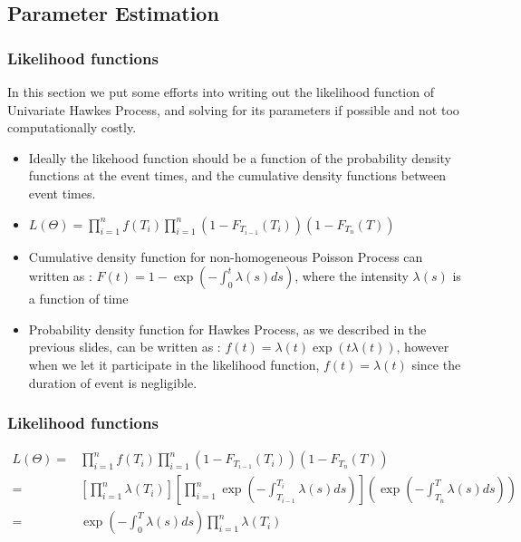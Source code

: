 \documentclass{beamer}
\begin{document}
\subsection{Parameter Estimation}
\begin{frame}
\frametitle{Likelihood functions}
In this section we put some efforts into writing out the likelihood function of Univariate Hawkes Process, and solving for its parameters if possible and not too computationally costly.
\begin{itemize}
	\item Ideally the likehood function should be a function of the probability density functions at the event times, and the cumulative density functions between event times.
	\item $L(\Theta) = \prod_{i=1}^n f(T_{i}) \prod_{i=1}^n (1-F_{T_{i-1}}(T_i)) (1-F_{T_{n}}(T))$
	\item Cumulative density function for non-homogeneous Poisson Process can written as : $F(t) = 1 - \exp(-\int_0^t \lambda(s) ds)$, where the intensity $\lambda(s)$ is a function of time
	\item Probability density function for Hawkes Process, as we described in the previous slides, can be written as : $f(t) = \lambda(t) \exp(t\lambda(t))$, however when we let it participate in the likelihood function, $f(t) = \lambda(t)$ since the duration of event is negligible.
\end{itemize}
\end{frame}

\begin{frame}
\frametitle{Likelihood functions}
\begin{equation*}
\begin{split}
L(\Theta) = &\prod_{i=1}^n f(T_{i}) \prod_{i=1}^n (1-F_{T_{i-1}}(T_i)) (1-F_{T_{n}}(T))\\
= &[\prod_{i=1}^n \lambda(T_{i})] [\prod_{i=1}^n \exp(-\int_{T_{i-1}}^{T_i} \lambda(s) ds)] (\exp(-\int_{T_{n}}^{T} \lambda(s) ds))\\
= &\exp(-\int_{0}^{T} \lambda(s) ds) \prod_{i=1}^n \lambda(T_{i})
\end{split}
\end{equation*}
\end{frame}
\end{document}
